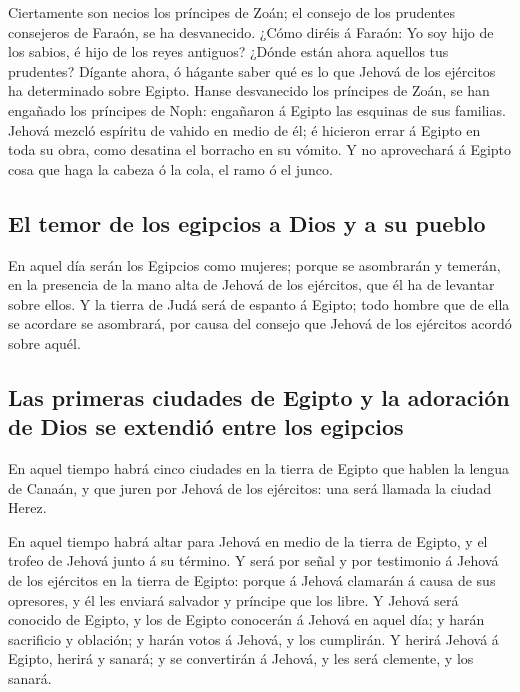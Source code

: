 Ciertamente son necios los príncipes de Zoán; el consejo
de los prudentes consejeros de Faraón, se ha desvanecido. ¿Cómo diréis á
Faraón: Yo soy hijo de los sabios, é hijo de los reyes antiguos?
 ¿Dónde están ahora aquellos tus prudentes? Dígante
ahora, ó hágante saber qué es lo que Jehová de los ejércitos ha
determinado sobre Egipto.  Hanse desvanecido los
príncipes de Zoán, se han engañado los príncipes de Noph: engañaron á
Egipto las esquinas de sus familias.  Jehová mezcló
espíritu de vahido en medio de él; é hicieron errar á Egipto en toda su
obra, como desatina el borracho en su vómito.  Y no
aprovechará á Egipto cosa que haga la cabeza ó la cola, el ramo ó el
junco.

\hypertarget{el-temor-de-los-egipcios-a-dios-y-a-su-pueblo}{%
\subsection{El temor de los egipcios a Dios y a su
pueblo}\label{el-temor-de-los-egipcios-a-dios-y-a-su-pueblo}}

 En aquel día serán los Egipcios como mujeres; porque se
asombrarán y temerán, en la presencia de la mano alta de Jehová de los
ejércitos, que él ha de levantar sobre ellos.  Y la
tierra de Judá será de espanto á Egipto; todo hombre que de ella se
acordare se asombrará, por causa del consejo que Jehová de los ejércitos
acordó sobre aquél.

\hypertarget{las-primeras-ciudades-de-egipto-y-la-adoraciuxf3n-de-dios-se-extendiuxf3-entre-los-egipcios}{%
\subsection{Las primeras ciudades de Egipto y la adoración de Dios se
extendió entre los
egipcios}\label{las-primeras-ciudades-de-egipto-y-la-adoraciuxf3n-de-dios-se-extendiuxf3-entre-los-egipcios}}

 En aquel tiempo habrá cinco ciudades en la tierra de
Egipto que hablen la lengua de Canaán, y que juren por Jehová de los
ejércitos: una será llamada la ciudad Herez.

 En aquel tiempo habrá altar para Jehová en medio de la
tierra de Egipto, y el trofeo de Jehová junto á su término.
 Y será por señal y por testimonio á Jehová de los
ejércitos en la tierra de Egipto: porque á Jehová clamarán á causa de
sus opresores, y él les enviará salvador y príncipe que los libre.
 Y Jehová será conocido de Egipto, y los de Egipto
conocerán á Jehová en aquel día; y harán sacrificio y oblación; y harán
votos á Jehová, y los cumplirán.  Y herirá Jehová á
Egipto, herirá y sanará; y se convertirán á Jehová, y les será clemente,
y los sanará.

